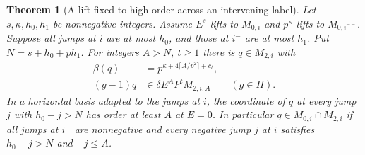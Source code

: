 \documentclass[a4paper,11pt]{article}
\newtheorem{theorem}[proposition]{Theorem}
\theoremstyle{definition}
\theoremstyle{remark}
\numberwithin{equation}{section}
\begin{document}
\begin{theorem}[A lift fixed to high order across an intervening label]
\leavevmode\label{thm:secondpoint775}
Let \(s,\kappa,h_0,h_1\) be nonnegative integers.
Assume \(E^s\) lifts to \(M_{0,i}\) and \(p^\kappa\) lifts
to \(M_{0,i^{--}}\). Suppose all jumps at \(i\) are at
most \(h_0\), and those at \(i^-\) are at most \(h_1\).
Put \(N=s+h_0+p h_1\). For integers \(A>N,\ t\ge1\)
there is \(q\in M_{2,i}\) with
\[
 \begin{split}
 \beta(q)&=p^{\kappa+4\lceil A/p^2\rceil+c_t},\\
 (g-1)q&\in\delta E^A P^t M_{2,i,A}\qquad(g\in H).
 \end{split}
\]
In a horizontal basis adapted to the jumps at \(i\), the
coordinate of \(q\) at every jump \(j\) with \(h_0-j>N\)
has order at least \(A\) at \(E=0\). In particular
\(q\in M_{0,i}\cap M_{2,i}\) if all jumps at \(i^-\)
are nonnegative and every negative jump \(j\) at \(i\)
satisfies \(h_0-j>N\) and \(-j\le A\).
\end{theorem}
\end{document}
